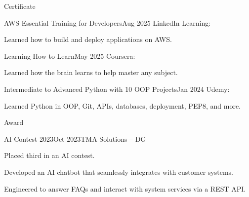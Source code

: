 \documentclass[12pt,a4paper]{cv}
\begin{document}
\begin{cvSection}{Certificate}

	\begin{cvSubsection}{AWS Essential Training for Developers}{Aug 2025}{
			LinkedIn Learning: 
		}
		\item[] Learned how to build and deploy applications on AWS.
	\end{cvSubsection}


	\begin{cvSubsection}{Learning How to Learn}{May 2025}{
			Coursera: 
		}
		\item[] Learned how the brain learns to help master any subject.
	\end{cvSubsection}


	\begin{cvSubsection}{Intermediate to Advanced Python with 10 OOP Projects}{Jan 2024}{
			Udemy: 
		}
		\item[] Learned Python in OOP, Git, APIs, databases, deployment, PEP8, and more.
	\end{cvSubsection}

\end{cvSection}


\begin{cvSection}{Award}

	\begin{cvSubsection}{AI Contest 2023}{Oct 2023}{TMA Solutions -- DG}
		\item Placed third in an AI contest.
		\item Developed an AI chatbot that seamlessly integrates with customer systems.
		\item Engineered to answer FAQs and interact with system services via a REST API.
	\end{cvSubsection}

\end{cvSection}
\end{document}
